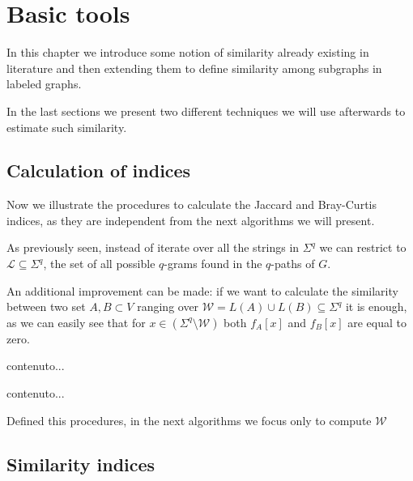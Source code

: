 
\chapter{Basic tools}

In this chapter we introduce some notion of similarity already existing in literature and then extending them to define similarity among subgraphs in labeled graphs. 

In the last sections we present two different techniques we will use afterwards to estimate such similarity.


\section{Calculation of indices}

Now we illustrate the procedures to calculate the Jaccard and Bray-Curtis indices, as they are independent from the next algorithms we will present.

As previously seen, instead of iterate over all the strings in $\Sigma^{q}$ we can restrict to $\mathcal{L} \subseteq \Sigma^{q}$, the set of all possible $q$-grams found in the $q$-paths of $G$. 

An additional improvement can be made: if we want to calculate the similarity between two set $A, B \subset V$ ranging over $\mathcal{W} = L(A) \cup L(B) \subseteq \Sigma^{q}$ it is enough, as we can easily see that for $x \in ( \Sigma^{q} \setminus \mathcal{W} )$ both $f_A[x]$ and $f_B[x]$ are equal to zero.

\begin{algorithm}
	contenuto...
\end{algorithm}

\begin{algorithm}
	contenuto...
\end{algorithm}

Defined this procedures, in the next algorithms we focus only to compute $\mathcal{W}$ 

\section{Similarity indices}

